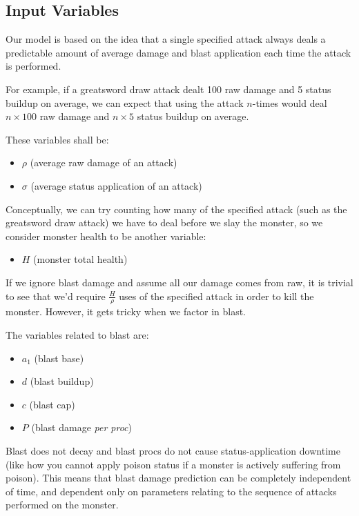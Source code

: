 \documentclass{article}
\begin{document}
\subsection{Input Variables}%
\label{sub:input_variables}

Our model is based on the idea that a single specified attack always deals a predictable amount of average damage and blast application each time the attack is performed.

For example, if a greatsword draw attack dealt 100 raw damage and 5 status buildup on average, we can expect that using the attack $n$-times would deal $n \times 100$ raw damage and $n \times 5$ status buildup on average.

These variables shall be:
\begin{itemize}
    \item $\rho$ (average raw damage of an attack)
    \item $\sigma$ (average status application of an attack)
\end{itemize}

Conceptually, we can try counting how many of the specified attack (such as the greatsword draw attack) we have to deal before we slay the monster, so we consider monster health to be another variable:
\begin{itemize}
    \item $H$ (monster total health)
\end{itemize}

If we ignore blast damage and assume all our damage comes from raw, it is trivial to see that we'd require $\frac{H}{\rho}$ uses of the specified attack in order to kill the monster. However, it gets tricky when we factor in blast.

The variables related to blast are:
\begin{itemize}
    \item $a_1$ (blast base)
    \item $d$ (blast buildup)
    \item $c$ (blast cap)
    \item $P$ (blast damage \textit{per proc})
\end{itemize}

Blast does not decay and blast procs do not cause status-application downtime (like how you cannot apply poison status if a monster is actively suffering from poison). This means that blast damage prediction can be completely independent of time, and dependent only on parameters relating to the sequence of attacks performed on the monster.
\end{document}

